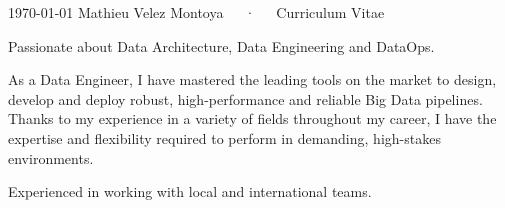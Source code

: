 \documentclass[11pt, a4paper]{awesome-cv}
\begin{document}
\makecvheader
\makecvfooter
{\today}
{Mathieu Velez Montoya~~~·~~~Curriculum Vitae}
{}


\begin{cvparagraph}
    Passionate about Data Architecture, Data Engineering and DataOps.

    As a Data Engineer, I have mastered the leading tools on the market to design, develop and deploy robust, high-performance and reliable Big Data pipelines. Thanks to my experience in a variety of fields throughout my career,
    I have the expertise and flexibility required to perform in demanding, high-stakes environments.
    
    Experienced in working with local and international teams.
\end{cvparagraph}





\end{document}
